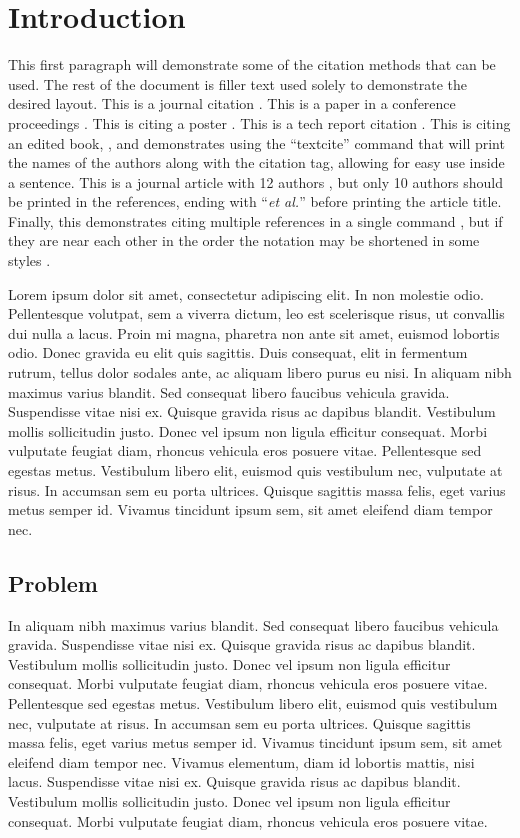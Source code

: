 \chapter{Introduction} 
This first paragraph will demonstrate some of the citation methods that can be used. The rest of the document is filler text used solely to demonstrate the desired layout.  This is a journal citation \autocite{berlin-tweb23}. This is a paper in a conference proceedings \autocite{weigle-jcdl23}. This is citing a poster \autocite{jayanetti-sbp23}. This is a tech report citation \autocite{weigle-2023}. This is citing an edited book, \textcite{vanet-book}, and demonstrates using the ``textcite'' command that will print the names of the authors along with the citation tag, allowing for easy use inside a sentence.  This is a journal article with 12 authors \autocite{coifman2005geometric}, but only 10 authors should be printed in the references, ending with ``\emph{et al.}'' before printing the article title.  Finally, this  demonstrates citing multiple references in a single command \autocites{jones-memento21,vanet-book,weigle-jcdl23}, but if they are near each other in the order the notation may be shortened in some styles \autocites{berlin-tweb23, weigle-jcdl23, jayanetti-sbp23}.

Lorem ipsum dolor sit amet, consectetur adipiscing elit. In non molestie odio. Pellentesque volutpat, sem a viverra dictum, leo est scelerisque risus, ut convallis dui nulla a lacus. Proin mi magna, pharetra non ante sit amet, euismod lobortis odio. Donec gravida eu elit quis sagittis. Duis consequat, elit in fermentum rutrum, tellus dolor sodales ante, ac aliquam libero purus eu nisi. In aliquam nibh maximus varius blandit. Sed consequat libero faucibus vehicula gravida. Suspendisse vitae nisi ex. Quisque gravida risus ac dapibus blandit. Vestibulum mollis sollicitudin justo. Donec vel ipsum non ligula efficitur consequat. Morbi vulputate feugiat diam, rhoncus vehicula eros posuere vitae. Pellentesque sed egestas metus. Vestibulum libero elit, euismod quis vestibulum nec, vulputate at risus. In accumsan sem eu porta ultrices. Quisque sagittis massa felis, eget varius metus semper id. Vivamus tincidunt ipsum sem, sit amet eleifend diam tempor nec. 

\section{Problem}
In aliquam nibh maximus varius blandit. Sed consequat libero faucibus vehicula gravida. Suspendisse vitae nisi ex. Quisque gravida risus ac dapibus blandit. Vestibulum mollis sollicitudin justo. Donec vel ipsum non ligula efficitur consequat. Morbi vulputate feugiat diam, rhoncus vehicula eros posuere vitae. Pellentesque sed egestas metus. Vestibulum libero elit, euismod quis vestibulum nec, vulputate at risus. In accumsan sem eu porta ultrices. Quisque sagittis massa felis, eget varius metus semper id. Vivamus tincidunt ipsum sem, sit amet eleifend diam tempor nec. Vivamus elementum, diam id lobortis mattis, nisi lacus. Suspendisse vitae nisi ex. Quisque gravida risus ac dapibus blandit. Vestibulum mollis sollicitudin justo. Donec vel ipsum non ligula efficitur consequat. Morbi vulputate feugiat diam, rhoncus vehicula eros posuere vitae. 


